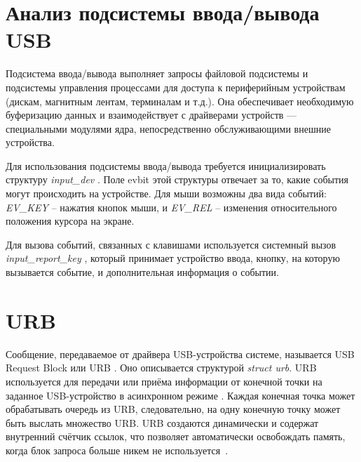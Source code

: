 \section{Анализ подсистемы ввода/вывода USB}
Подсистема ввода/вывода выполняет запросы файловой подсистемы и подсистемы управления процессами для доступа к периферийным устройствам (дискам, магнитным лентам, терминалам и т.д.). Она обеспечивает необходимую буферизацию данных и взаимодействует с драйверами устройств — специальными модулями ядра, непосредственно обслуживающими внешние устройства.

Для использования подсистемы ввода/вывода требуется инициализировать структуру \textit{input\_dev} \cite{input_dev}. 
Поле evbit этой структуры отвечает за то, какие события могут происходить на устройстве.
Для мыши возможны два вида событий: \textit{EV\_KEY} \cite{EV_KEY} -- нажатия кнопок мыши, и \textit{EV\_REL} -- изменения относительного положения курсора на экране.

Для вызова событий, связанных с клавишами используется системный вызов \textit{input\_report\_key} \cite{input_report_key}, который принимает устройство ввода, кнопку, на которую вызывается событие, и дополнительная информация о событии.

\section{URB}
Сообщение, передаваемое от драйвера USB-устройства системе, называется USB Request Block или URB \cite{ldd}. 
Оно описывается структурой \textit{struct urb}.
URB используется для передачи или приёма информации от конечной точки на заданное USB-устройство в асинхронном режиме \cite{urb}.
Каждая конечная точка может обрабатывать очередь из URB, следовательно, на одну конечную точку может быть выслать множество URB.
URB создаются динамически и содержат внутренний счётчик ссылок, что позволяет автоматически освобождать память, когда блок запроса больше никем не используется~\cite{ldd}.

